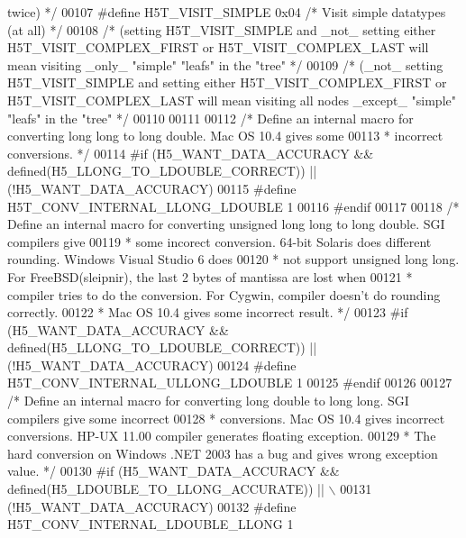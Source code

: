 \begin{DoxyCode}
{       twice) */}
00107 \textcolor{preprocessor}{#define H5T\_VISIT\_SIMPLE        0x04            }\textcolor{comment}{/* Visit simple datatypes (at all) */}\textcolor{preprocessor}{}
00108                                                 \textcolor{comment}{/* (setting H5T\_VISIT\_SIMPLE and \_not\_ setting either
       H5T\_VISIT\_COMPLEX\_FIRST or H5T\_VISIT\_COMPLEX\_LAST will mean visiting \_only\_ "simple" "leafs" in the "tree" */}
00109                                                 \textcolor{comment}{/* (\_not\_ setting H5T\_VISIT\_SIMPLE and setting either
       H5T\_VISIT\_COMPLEX\_FIRST or H5T\_VISIT\_COMPLEX\_LAST will mean visiting all nodes \_except\_ "simple" "leafs" in the
       "tree" */}
00110 
00111 
00112 \textcolor{comment}{/* Define an internal macro for converting long long to long double.  Mac OS 10.4 gives some}
00113 \textcolor{comment}{ * incorrect conversions. */}
00114 \textcolor{preprocessor}{#if (H5\_WANT\_DATA\_ACCURACY && defined(H5\_LLONG\_TO\_LDOUBLE\_CORRECT)) || (!H5\_WANT\_DATA\_ACCURACY)}
00115 \textcolor{preprocessor}{#define H5T\_CONV\_INTERNAL\_LLONG\_LDOUBLE       1}
00116 \textcolor{preprocessor}{#endif}
00117 
00118 \textcolor{comment}{/* Define an internal macro for converting unsigned long long to long double.  SGI compilers give}
00119 \textcolor{comment}{ * some incorect conversion.  64-bit Solaris does different rounding.   Windows Visual Studio 6 does}
00120 \textcolor{comment}{ * not support unsigned long long.  For FreeBSD(sleipnir), the last 2 bytes of mantissa are lost when}
00121 \textcolor{comment}{ * compiler tries to do the conversion.  For Cygwin, compiler doesn't do rounding correctly.}
00122 \textcolor{comment}{ * Mac OS 10.4 gives some incorrect result. */}
00123 \textcolor{preprocessor}{#if (H5\_WANT\_DATA\_ACCURACY && defined(H5\_LLONG\_TO\_LDOUBLE\_CORRECT)) || (!H5\_WANT\_DATA\_ACCURACY)}
00124 \textcolor{preprocessor}{#define H5T\_CONV\_INTERNAL\_ULLONG\_LDOUBLE         1}
00125 \textcolor{preprocessor}{#endif}
00126 
00127 \textcolor{comment}{/* Define an internal macro for converting long double to long long.  SGI compilers give some incorrect}
00128 \textcolor{comment}{ * conversions. Mac OS 10.4 gives incorrect conversions. HP-UX 11.00 compiler generates floating exception.}
00129 \textcolor{comment}{ * The hard conversion on Windows .NET 2003 has a bug and gives wrong exception value. */}
00130 \textcolor{preprocessor}{#if (H5\_WANT\_DATA\_ACCURACY && defined(H5\_LDOUBLE\_TO\_LLONG\_ACCURATE)) || \(\backslash\)}
00131 \textcolor{preprocessor}{    (!H5\_WANT\_DATA\_ACCURACY)}
00132 \textcolor{preprocessor}{#define H5T\_CONV\_INTERNAL\_LDOUBLE\_LLONG         1}

\end{DoxyCode}
